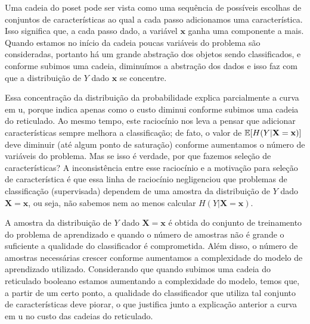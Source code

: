 Uma cadeia do poset pode ser vista como uma sequência de possíveis
escolhas de conjuntos de características ao qual a cada passo 
adicionamos uma característica. Isso significa que, a cada passo dado,
a variável $\mathbf{x}$ ganha uma componente a mais. Quando estamos no 
início da cadeia poucas variáveis do problema são consideradas, portanto
há um grande abstração dos objetos sendo classificados, e conforme 
subimos uma cadeia, diminuímos a abstração dos dados e isso faz com que
a distribuição de $Y$ dado $\mathbf{x}$ se concentre.

Essa concentração da distribuição da probabilidade explica parcialmente
a curva em u, porque indica apenas como o custo diminui conforme subimos 
uma cadeia do reticulado. Ao mesmo tempo, este raciocínio nos leva a 
pensar que adicionar características sempre melhora a classificação; de 
fato, o valor de $\mathbb{E}[H (Y | \mathbf{X = x})]$ deve diminuir 
(até algum ponto de saturação) conforme aumentamos o número de variáveis
do problema. Mas se isso é verdade, por que fazemos seleção de 
características? A inconsistência entre esse raciocínio e a motivação
para seleção de característica é que essa linha de raciocínio 
negligenciou que problemas de classificação (supervisada) dependem de 
uma amostra da distribuição de $Y$ dado $\mathbf{X = x}$, ou seja, 
não sabemos nem ao menos calcular $H (Y | \mathbf{X = x})$.

A amostra da distribuição de $Y$ dado $\mathbf{X = x}$ é obtida do 
conjunto de treinamento do problema de aprendizado e quando o número
de amostras não é grande o suficiente a qualidade do classificador 
é comprometida. Além disso, o número de amostras necessárias
crescer conforme aumentamos a complexidade do modelo de aprendizado 
utilizado. Considerando que quando subimos uma cadeia do reticulado 
booleano estamos aumentando a complexidade do modelo, temos que, a
partir de um certo ponto, a qualidade do classificador que utiliza tal 
conjunto de características deve piorar, o que justifica junto a 
explicação anterior a curva em u no custo das cadeias do reticulado.


